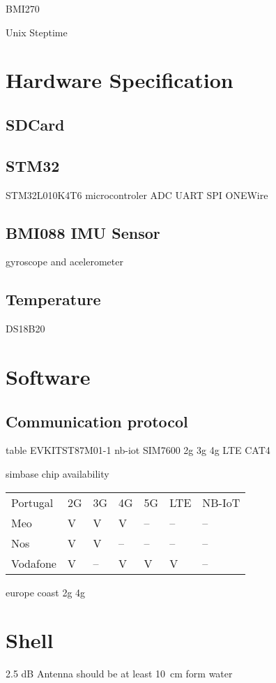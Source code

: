 BMI270


Unix Steptime

\section{Hardware Specification}
\subsection{SDCard}
\subsection{STM32}

STM32L010K4T6
microcontroler
ADC
UART
SPI
ONEWire
\subsection{BMI088 IMU Sensor}
gyroscope and acelerometer


\subsection{Temperature}
DS18B20
\section{Software}

\subsection{Communication protocol}

table
EVKITST87M01-1 nb-iot
SIM7600 2g 3g 4g LTE CAT4

simbase chip availability

\begin{table}
    \centering
    \begin{tabular}{lllllll}
    Portugal & 2G & 3G & 4G & 5G & LTE & NB-IoT   \\
    Meo      & V  & V  & V  & -- & --  & --       \\
    Nos      & V  & V  & -- & -- & --  & --       \\
    Vodafone & V  & -- & V  & V  & V   & -- 
    \end{tabular}
\end{table}

europe coast
2g 4g


\section{Shell}
2.5 dB Antenna should be at least 10 cm form water 


